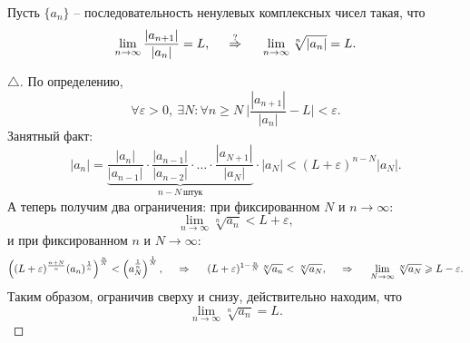 
Пусть $\{a_n\}$ -- последовательность ненулевых комплексных чисел такая, что
\begin{equation*}
    \lim_{n \to \infty}\frac{|a_{n+1}|}{|a_n|} = L,
    \hspace{0.5cm} \overset{?}{\Rightarrow}  \hspace{0.5cm} \lim_{n \to \infty} \sqrt[n]{|a_n|} = L.
\end{equation*}

\begin{proof}[$\triangle$]

По определению, 
\begin{equation*}
    \forall  \varepsilon > 0,
    \ \exists  N \colon  \forall  n \geq N \ 
    \bigg| \frac{|a_{n+1}|}{|a_n|} - L \bigg| < \varepsilon.
\end{equation*}
Занятный факт:
\begin{equation*}
    |a_n| = \underbrace{\frac{|a_n|}{|a_{n-1}|} \cdot \frac{|a_{n-1}|}{|a_{n-2}|} \cdot \ldots
    \cdot 
    \frac{|a_{N+1}|}{|a_N|}}_{n-N \ \text{штук}} \cdot |a_N| < (L + \varepsilon)^{n-N} |a_N|.
\end{equation*}
А теперь получим два ограничения: при фиксированном $N$  и $n \to \infty$:
\begin{equation*}
    \lim_{n \to \infty} \sqrt[n]{a_n} < L + \varepsilon,
\end{equation*}
и при фиксированном $n$ и $N \to \infty$:
\begin{equation*}
    \left(
        (L+\varepsilon)^{\frac{n + N}{n}} (a_n)^{\frac{1}{n}}
    \right)^{\frac{n}{N}} < 
    \left(
        a_N^{\frac{1}{n}}
    \right)^{\frac{1}{N}},
    \hspace{0.5cm} \Rightarrow \hspace{0.5cm}
    (L + \varepsilon)^{1- \frac{n}{N}} \sqrt[N]{a_n} < \sqrt[N]{a_N},
    \hspace{0.5cm} \Rightarrow \hspace{0.5cm}
    \lim_{N \to \infty} \sqrt[N]{a_N} \geq L -\varepsilon.
\end{equation*}
Таким образом, ограничив сверху и снизу, действительно находим, что
\begin{equation*}
    \lim_{n \to \infty} \sqrt[n]{a_n} = L.
\end{equation*}

\end{proof}